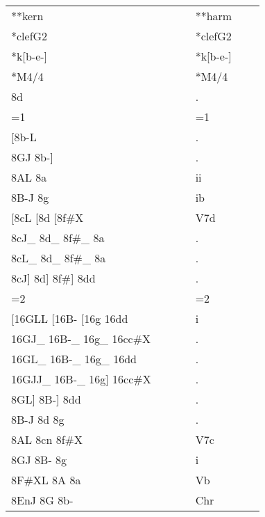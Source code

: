 \begin{tabular}{lllll}
**kern                        & $\quad \quad$ & **harm       \\
*clefG2                       & $\quad \quad$ & *clefG2      \\
*k{[}b-e-{]}                  & $\quad \quad$ & *k{[}b-e-{]} \\
*M4/4                         & $\quad \quad$ & *M4/4        \\
8d                            & $\quad \quad$ & .            \\
=1                            & $\quad \quad$ & =1           \\
{[}8b-L                       & $\quad \quad$ & .            \\
8GJ 8b-{]}                    & $\quad \quad$ & .            \\
8AL 8a                        & $\quad \quad$ & ii           \\
8B-J 8g                       & $\quad \quad$ & ib           \\
{[}8cL {[}8d {[}8f\#X         & $\quad \quad$ & V7d          \\
8cJ\_ 8d\_ 8f\#\_ 8a          & $\quad \quad$ & .            \\
8cL\_ 8d\_ 8f\#\_ 8a          & $\quad \quad$ & .            \\
8cJ{]} 8d{]} 8f\#{]} 8dd      & $\quad \quad$ & .            \\
=2                            & $\quad \quad$ & =2           \\
{[}16GLL {[}16B- {[}16g 16dd  & $\quad \quad$ & i            \\
16GJ\_ 16B-\_ 16g\_ 16cc\#X   & $\quad \quad$ & .            \\
16GL\_ 16B-\_ 16g\_ 16dd      & $\quad \quad$ & .            \\
16GJJ\_ 16B-\_ 16g{]} 16cc\#X & $\quad \quad$ & .            \\
8GL{]} 8B-{]} 8dd             & $\quad \quad$ & .            \\
8B-J 8d 8g                    & $\quad \quad$ & .            \\
8AL 8cn 8f\#X                 & $\quad \quad$ & V7c          \\
8GJ 8B- 8g                    & $\quad \quad$ & i            \\
8F\#XL 8A 8a                  & $\quad \quad$ & Vb           \\
8EnJ 8G 8b-                   & $\quad \quad$ & Chr          \\

\end{tabular}
